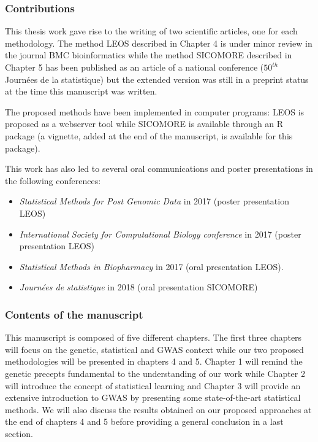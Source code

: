\documentclass[]{book}
\begin{document}
\hypertarget{contributions}{%
\subsubsection*{Contributions}\label{contributions}}

This thesis work gave rise to the writing of two scientific articles,
one for each methodology. The method LEOS described in Chapter 4 is
under minor review in the journal BMC bioinformatics while the method
SICOMORE described in Chapter 5 has been published as an article of a
national conference (\(50^{th}\) Journées de la statistique) but the
extended version was still in a preprint status at the time this
manuscript was written.

The proposed methods have been implemented in computer programs: LEOS is
proposed as a webserver tool while SICOMORE is available through an R
package (a vignette, added at the end of the manuscript, is available
for this package).

This work has also led to several oral communications and poster
presentations in the following conferences:

\begin{itemize}
\item
  \emph{Statistical Methods for Post Genomic Data} in 2017 (poster
  presentation LEOS)
\item
  \emph{International Society for Computational Biology conference} in 2017
  (poster presentation LEOS)
\item
  \emph{Statistical Methods in Biopharmacy} in 2017 (oral presentation
  LEOS).
\item
  \emph{Journées de statistique} in 2018 (oral presentation SICOMORE)
\end{itemize}

\hypertarget{contents-of-the-manuscript}{%
\subsubsection*{Contents of the manuscript}\label{contents-of-the-manuscript}}

This manuscript is composed of five different chapters. The first three
chapters will focus on the genetic, statistical and GWAS context while
our two proposed methodologies will be presented in chapters 4 and 5.
Chapter 1 will remind the genetic precepts fundamental to the
understanding of our work while Chapter 2 will introduce the concept of
statistical learning and Chapter 3 will provide an extensive
introduction to GWAS by presenting some state-of-the-art statistical
methods. We will also discuss the results obtained on our proposed
approaches at the end of chapters 4 and 5 before providing a general
conclusion in a last section.
\end{document}
